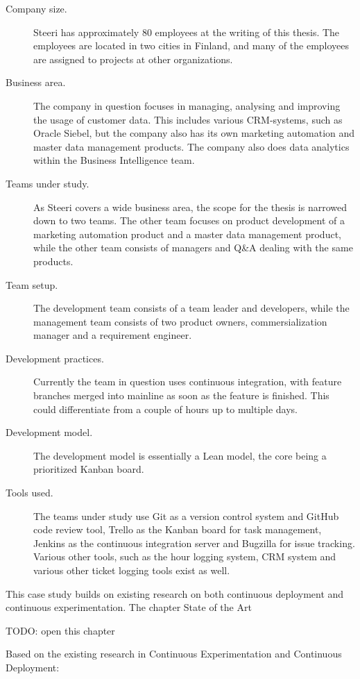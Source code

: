 \documentclass[english]{tktltiki2}
\theoremstyle{definition}
\theoremstyle{remark}
\begin{document}
\begin{description}
  \item[Company size.] Steeri has approximately 80 employees at the writing of this thesis. The employees are located in two cities in Finland, and many of the employees are assigned to projects at other organizations.
  \item[Business area.] The company in question focuses in managing, analysing and improving the usage of customer data. This includes various CRM-systems, such as Oracle Siebel, but the company also has its own marketing automation and master data management products. The company also does data analytics within the Business Intelligence team.
  \item[Teams under study.] As Steeri covers a wide business area, the scope for the thesis is narrowed down to two teams. The other team focuses on product development of a marketing automation product and a master data management product, while the other team consists of managers and Q&A dealing with the same products.
  \item[Team setup.] The development team consists of a team leader and developers, while the management team consists of two product owners, commersialization manager and a requirement engineer. 
  \item[Development practices.] Currently the team in question uses continuous integration, with feature branches merged into mainline as soon as the feature is finished. This could differentiate from a couple of hours up to multiple days.
  \item[Development model.] The development model is essentially a Lean model, the core being a prioritized Kanban board.  
  \item[Tools used.] The teams under study use Git as a version control system and GitHub code review tool, Trello as the Kanban board for task management, Jenkins as the continuous integration server and Bugzilla for issue tracking. Various other tools, such as the hour logging system, CRM system and various other ticket logging tools exist as well.  
\end{description}

This case study builds on existing research on both continuous deployment and continuous experimentation. The chapter State of the Art 

TODO: open this chapter

Based on the existing research in Continuous Experimentation and Continuous Deployment:
\end{document}
